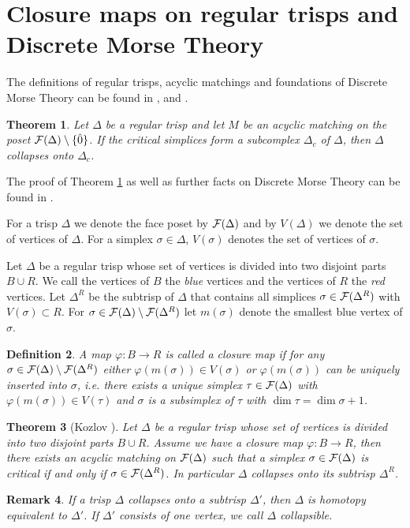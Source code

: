 \documentclass{elsarticle}
\newtheorem{df}{Definition}[section]
\newtheorem{thm}[df]{Theorem}
\newtheorem{rem}[df]{Remark}
\begin{document}
\section{Closure maps on regular trisps and Discrete Morse Theory}
The definitions of regular trisps, acyclic matchings and foundations of Discrete Morse Theory can be found in \cite{forman}, \cite{clmap} and \cite{buch}.
\begin{thm}%
\label{morsemain}
Let $\Delta$ be a regular trisp and let $M$ be an acyclic matching on the poset ${\cal F}(\Delta)\setminus\{\hat{0}\}$. If the critical simplices form a subcomplex $\Delta_c$ of $\Delta$, then $\Delta$ collapses onto $\Delta_c$.
\end{thm}
The proof of Theorem \ref{morsemain} as well as further facts on Discrete Morse Theory can be found in \cite[Chapter 11]{buch}.

For a trisp $\Delta$ we denote the face poset by ${\cal F}(\Delta)$ and by $V(\Delta)$ we denote the set of vertices of $\Delta$. For a simplex $\sigma\in\Delta$, $V(\sigma)$ denotes the set of vertices of $\sigma$.

Let $\Delta$ be a regular trisp whose set of vertices is divided into two disjoint parts $B\cup R$. We call the vertices of $B$ the \emph{blue} vertices and the vertices of $R$ the \emph{red} vertices. Let $\Delta^R$ be the subtrisp of $\Delta$ that contains all simplices $\sigma\in{\cal F}(\Delta^R)$ with $V(\sigma)\subset R$. For $\sigma\in{\cal F}(\Delta)\setminus{\cal F}(\Delta^R)$ let $m(\sigma)$ denote the smallest blue vertex of $\sigma$.
\begin{df}
A map $\varphi:B\longrightarrow R$ is called a \emph{closure map} if for any $\sigma\in{\cal F}(\Delta)\setminus{\cal F}(\Delta^R)$ either $\varphi(m(\sigma))\in V(\sigma)$ or $\varphi(m(\sigma))$ can be uniquely inserted into $\sigma$, i.e. there exists a unique simplex $\tau\in{\cal F}(\Delta)$ with $\varphi(m(\sigma))\in V(\tau)$ and $\sigma$ is a subsimplex of $\tau$ with $\dim\tau=\dim\sigma+1$.
\end{df}
\begin{thm}[Kozlov \cite{clmap}]
\label{clthm}
Let $\Delta$ be a regular trisp whose set of vertices is divided into two disjoint parts $B\cup R$. Assume we have a closure map $\varphi:B\longrightarrow R$, then there exists an acyclic matching on ${\cal F}(\Delta)$ such that a simplex $\sigma\in{\cal F}(\Delta)$ is critical if and only if $\sigma\in{\cal F}(\Delta^R)$. In particular $\Delta$ collapses onto its subtrisp $\Delta^R$.
\end{thm}
\begin{rem}
\label{coll}
If a trisp $\Delta$ collapses onto a subtrisp $\Delta'$, then $\Delta$ is homotopy equivalent to $\Delta'$. If $\Delta'$ consists of one vertex, we call $\Delta$ \emph{collapsible}.
\end{rem}
\end{document}
